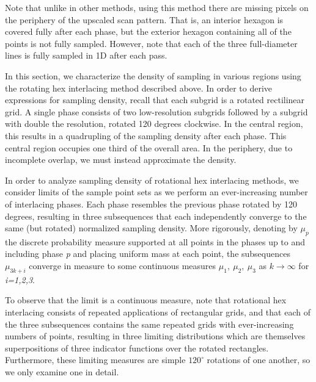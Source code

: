 \documentclass[aip, amsmath, amssymb, nobibnotes, nofootinbib, citeautoscript, reprint, superscriptaddress]{revtex4-2}
\begin{document}
    Note that unlike in other methods, using this method there are missing pixels on the periphery of the upscaled scan pattern.
    That is, an interior hexagon is covered fully after each phase, but the exterior hexagon containing all of the points is not fully sampled.
    However, note that each of the three full-diameter lines is fully sampled in 1D after each pass.


    In this section, we characterize the density of sampling in various regions using the rotating hex interlacing method described above.
    In order to derive expressions for sampling density, recall that each subgrid is a rotated rectilinear grid.
    A single phase consists of two low-resolution subgrids followed by a subgrid with double the resolution, rotated 120 degrees clockwise.
    In the central region, this results in a quadrupling of the sampling density after each phase.
    This central region occupies one third of the overall area.
    In the periphery, due to incomplete overlap, we must instead approximate the density.


    In order to analyze sampling density of rotational hex interlacing methods, we consider limits of the sample point sets as we perform an ever-increasing number of interlacing phases.
    Each phase resembles the previous phase rotated by 120 degrees, resulting in three subsequences that each independently converge to the same (but rotated) normalized sampling density.
    More rigorously, denoting by $\mu_p$ the discrete probability measure supported at all points in the phases up to and including phase \textit{p} and placing uniform mass at each point, the subsequences $\mu_{3k+i}$ converge in measure to some continuous measures $\mu_1,\ \mu_2,\ \mu_3$ as $k\to\infty$ for \textit{i=1,2,3}.


    To observe that the limit is a continuous measure, note that rotational hex interlacing consists of repeated applications of rectangular grids, and that each of the three subsequences contains the same repeated grids with ever-increasing numbers of points, resulting in three limiting distributions which are themselves superpositions of three indicator functions over the rotated rectangles.
    Furthermore, these limiting measures are simple $120^{\circ}$ rotations of one another, so we only examine one in detail.
\end{document}

